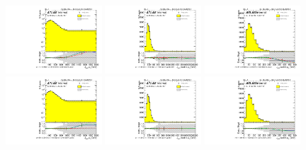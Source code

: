 \begin{figure}[htbp!]
\begin{center}
\includegraphics[angle=270, width=0.32\textwidth]{./figures/boosted/Reweight/Fits/Moriond_bkg_3_NoTag_4Trk_lead_Incl_sublHCand_Pt_m_1.pdf}
\includegraphics[angle=270, width=0.32\textwidth]{./figures/boosted/Reweight/Fits/Moriond_bkg_3_NoTag_4Trk_lead_Incl_sublHCand_trk0_Pt.pdf}
\includegraphics[angle=270, width=0.32\textwidth]{./figures/boosted/Reweight/Fits/Moriond_bkg_3_NoTag_4Trk_lead_Incl_sublHCand_trk1_Pt.pdf} \\
\includegraphics[angle=270, width=0.32\textwidth]{./figures/boosted/Reweight/Fits/Moriond_bkg_9_NoTag_4Trk_lead_Incl_sublHCand_Pt_m_1.pdf}
\includegraphics[angle=270, width=0.32\textwidth]{./figures/boosted/Reweight/Fits/Moriond_bkg_9_NoTag_4Trk_lead_Incl_sublHCand_trk0_Pt.pdf}
\includegraphics[angle=270, width=0.32\textwidth]{./figures/boosted/Reweight/Fits/Moriond_bkg_9_NoTag_4Trk_lead_Incl_sublHCand_trk1_Pt.pdf} \\

\end{center}
\end{figure}
